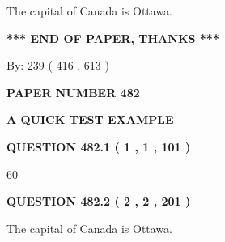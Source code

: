 \documentclass[12pt]{article}
\begin{document}
  
 
 
\noindent{}
 
 
The capital of Canada is Ottawa.
 
 
 
 
   
   
 \vspace{0.2in}
 
   
   
   
   
\vspace{1.0in} 
{\textbf{\large{ *** END OF PAPER, THANKS *** }}} 
   
   
\hspace{1.0in} By: 
 239 ( 416 ,  613 )
   
   
   
   
\newpage 
\setcounter{page}{ 
   482001 } 
   
   
   
   
 {\textbf{ \Large{ PAPER NUMBER  482  }}}
   
   
\vspace{0.2in}
   
   
   
   
   
   
 \vspace{0.2in}
{\LARGE {\textbf{ A QUICK TEST EXAMPLE}}}
   
   
  
\vspace{0.2in}
  
{\textbf{\Large{QUESTION
482.1 
 ( 1 , 1 , 101 )
}}}
  
  
 
 
\noindent{}

60
 
 
  
\vspace{0.2in}
  
{\textbf{\Large{QUESTION
482.2 
 ( 2 , 2 , 201 )
}}}
  
  
 
 
\noindent{}
 
 
The capital of Canada is Ottawa.
 
\end{document}
